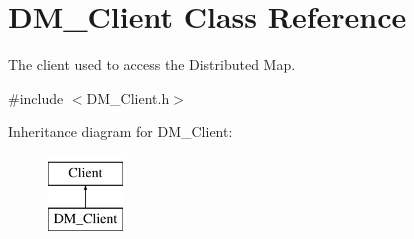 \hypertarget{class_d_m___client}{
\section{DM\_\-Client Class Reference}
\label{class_d_m___client}
}


The client used to access the Distributed Map.  




{\ttfamily \#include $<$DM\_\-Client.h$>$}

Inheritance diagram for DM\_\-Client:\begin{figure}[H]
\begin{center}
\leavevmode
\includegraphics[height=2cm]{class_d_m___client}
\end{center}
\end{figure}

